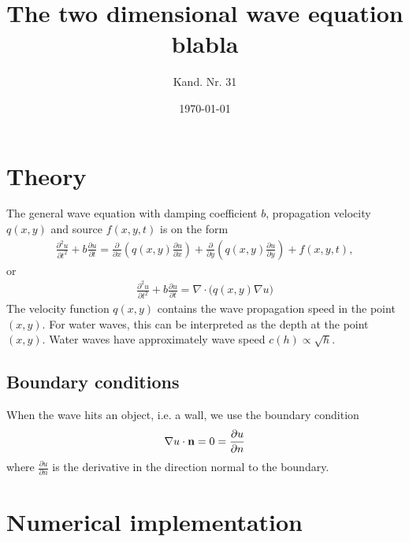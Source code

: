 \documentclass[a4paper,10pt]{article}
\title{The two dimensional wave equation blabla}
\date{\today}
\author{Kand. Nr. 31}
\renewcommand{\(}{\left(}
\renewcommand{\)}{\right)}
\newcommand{\dpart}[2]{\frac{\partial#1}{\partial#2}}
\begin{document}
\section*{Theory}
The general wave equation with damping coefficient $b$, propagation velocity $q(x,y)$ and source $f(x,y,t)$ is on the form
\begin{align}
\frac{\partial^2 u}{\partial t^2} + b\frac{\partial u}{\partial t} =
\frac{\partial}{\partial x}\left( q (x,y)
\frac{\partial u}{\partial x}\right) +
\frac{\partial}{\partial y}\left( q (x,y)
\frac{\partial u}{\partial y}\right) + f(x,y,t),
\end{align}
or
\begin{align}
\frac{\partial^2 u}{\partial t^2} + b\frac{\partial u}{\partial t} =
\nabla \cdot \big(q(x,y) \nabla u \big )
\end{align}
The velocity function $q(x,y)$ contains the wave propagation speed in the point $(x,y)$. For water waves, this can be interpreted as the depth at the point $(x,y)$. Water waves have approximately wave speed $c(h) \propto \sqrt h$.
\subsection*{Boundary conditions}
When the wave hits an object, i.e. a wall, we use the boundary condition
\begin{align*}
\nabla u\cdot \textbf n = 0 = \dpart{u}{n}
\end{align*}
where $\dpart{u}{n}$ is the derivative in the direction normal to the boundary. 
\section*{Numerical implementation}
\end{document}
